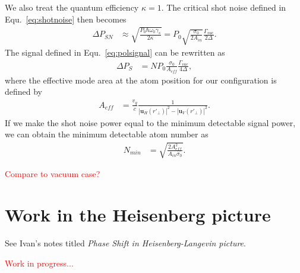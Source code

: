 \documentclass[]{report}
\begin{document}
We also treat the quantum efficiency $ \kappa=1 $. The critical shot noise defined in Equ.~\eqref{eq:shotnoise} then becomes
\begin{align}
\Delta P_{SN} &\approx \sqrt{\frac{P_0 \hbar \omega_0 \gamma_s}{2\kappa }} =P_0\sqrt{\frac{ \sigma_0 }{2A_{in}}}\frac{\Gamma_{vac}}{2\Delta}.
\end{align}
The signal defined in Equ.~\eqref{eq:polsignal} can be rewritten as
\begin{align}
\Delta P_S &= NP_0 \frac{\sigma_0}{A_{e\!f\!f}}\frac{\Gamma_{vac}}{4\Delta},
\end{align}
where the effective mode area at the atom position for our configuration is defined by
\begin{align}
A_{e\!f\!f} &= \frac{v_g}{c}\frac{1}{| \mathbf{u}_H(r'_{\!\perp})|^2- | \mathbf{u}_V(r'_{\!\perp})|^2}.
\end{align}
If we make the shot noise power equal to the minimum detectable signal power, we can obtain the minimum detectable atom number as
\begin{align}
N_{min} &= \sqrt{\frac{2A_{e\!f\!f}^2}{A_{in}\sigma_0}}.
\end{align}

\textcolor{red}{Compare to vacuum case?}


\section{Work in the Heisenberg picture}
See Ivan's notes titled \textit{Phase Shift in Heisenberg-Langevin picture}.

\textcolor{red}{Work in progress...} 



\appendix








%

\ifwindows
	
\else
	
\fi

\printindex
\end{document}
